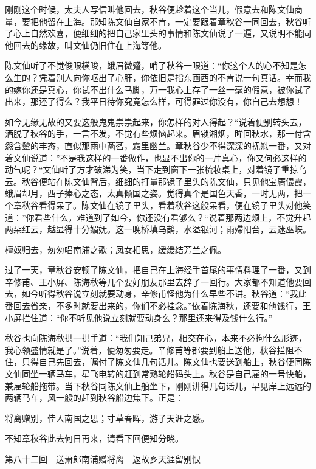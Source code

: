 \documentclass[12pt,UTF8]{ctexbook}
\begin{document}
{{{刚刚这个时候，太夫人写信叫他回去，秋谷便趁着这个当儿，假意去和陈文仙商量，要把他留在上海。那知陈文仙自家不肯，一定要跟着章秋谷一同回去，秋谷听了心上自然欢喜，便细细的把自己家里头的事情和陈文仙说了一遍，又说明不能同他回去的缘故，叫文仙仍旧住在上海等他。

陈文仙听了不觉俊眼横睃，蛾眉微蹙，哨了秋谷一眼道：“你这个人的心不知是怎么生的？凭着别人向你呕出了心肝，你依旧是指东画西的不肯说一句真话。幸而我的嫁你还是真心，你试不出什么马脚，万一我心上存了一丝一毫的假意，被你试了出来，那还了得么？我平日待你究竟怎么样，可得罪过你没有，你自己去想想！

如今无缘无故的又要这般鬼鬼祟祟起来，你怎样的对人得起？“说着便别转头去，洒脱了秋谷的手，一言不发，不觉有些烦恼起来。眉锁湘烟，眸回秋水，那一付含怨含颦的丰态，直似那雨中菡萏，霜里幽兰。章秋谷少不得深深的抚慰一番，又对着文仙说道：”不是我这样的一番做作，也显不出你的一片真心，你又何必这样的动气呢？“文仙听了方才破涕为笑，当下走到窗下一张梳妆桌上，对着镜子重掠乌云。秋谷便站在陈文仙背后，细细的打量那镜子里头的陈文仙，只见他宝靥偎霞，蛾眉却月，西子捧心之态，太真倾国之姿。觉得真个是国色天香，一时无两，把一个章秋谷看得呆了。陈文仙在镜子里头，看着秋谷这般呆看，便在镜子里头对他笑道：”你看些什么，难道到了如今，你还没有看够么？“说着那两边颊上，不觉升起两朵红云，越显得十分媚妩。这一晚桥填乌鹊，水溢银河；雨殢阳台，云迷巫峡。

檀奴归去，匆匆唱南浦之歌；凤女相思，缓缓结芳兰之佩。

过了一天，章秋谷安顿了陈文仙，把自己在上海经手首尾的事情料理了一番，又到辛修甫、王小屏、陈海秋等几个要好朋友那里去辞了一回行。大家都不知道他要回去，如今听得秋谷说立刻就要动身，辛修甫怪他为什么早些不讲。秋谷道：“我此番回去省亲，不多时就要出来的，你们不必挂念。”依着陈海秋，还要和他饯行，王小屏拦住道：“你不听见他说立刻就要动身么？那里还来得及饯什么行。”

秋谷也向陈海秋拱一拱手道：“我们知己弟兄，相交在心，本来不必拘什么形迹，我心领盛情就是了。”说着，便匆匆要走。辛修甫等都要到船上送他，秋谷拦阻不住，只得自己先回去，嘱付了陈文仙几句话儿。陈文仙也要送到船上，秋谷便同陈文仙同坐一辆马车，星飞电转的赶到常熟轮船码头上。秋谷是自己雇的一号快船，兼雇轮船拖带。当下秋谷同陈文仙上船坐下，刚刚讲得几句话儿，早见岸上远远的两辆马车，风一般的赶到秋谷船边焦下。正是：

将离赠别，佳人南国之思；寸草春晖，游子天涯之感。

不知章秋谷此去何日再来，请看下回便知分晓。





第八十二回　送萧郎南浦赠将离　返故乡天涯留别恨





}}}
\end{document}
